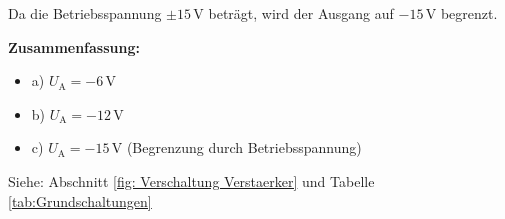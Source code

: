 {Da die Betriebsspannung $\pm 15\,\mathrm{V}$ beträgt, wird der Ausgang auf $-15\,\mathrm{V}$ begrenzt.


\textbf{Zusammenfassung:}
\begin{itemize}
    \item a) $U_\mathrm{A} = -6\,\mathrm{V}$
    \item b) $U_\mathrm{A} = -12\,\mathrm{V}$
    \item c) $U_\mathrm{A} = -15\,\mathrm{V}$ (Begrenzung durch Betriebsspannung)
\end{itemize}

  Siehe: Abschnitt \ref{fig: Verschaltung Verstaerker} und Tabelle \ref{tab:Grundschaltungen}
    
}
